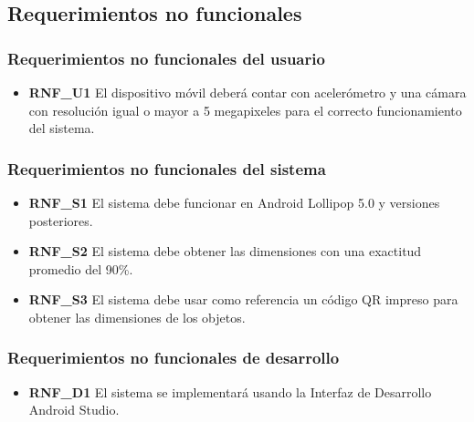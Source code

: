 \subsection{Requerimientos no funcionales}

\subsubsection{Requerimientos no funcionales del usuario}
\begin{itemize}
\item \textbf{RNF\_U1} El dispositivo móvil deberá contar con acelerómetro y una cámara con resolución igual o mayor a 5 megapixeles para el correcto funcionamiento del sistema.
\end{itemize}

\subsubsection{Requerimientos no funcionales del sistema}
\begin{itemize}
\item \textbf{RNF\_S1} El sistema debe funcionar en Android Lollipop 5.0 y versiones posteriores.
\item \textbf{RNF\_S2} El sistema debe obtener las dimensiones con una exactitud promedio del 90\%.
\item \textbf{RNF\_S3} El sistema debe usar como referencia un código QR impreso para obtener las dimensiones de los objetos.
\end{itemize}

\subsubsection{Requerimientos no funcionales de desarrollo}
\begin{itemize}
\item \textbf{RNF\_D1} El sistema se implementará usando la Interfaz de Desarrollo Android Studio.
\end{itemize}